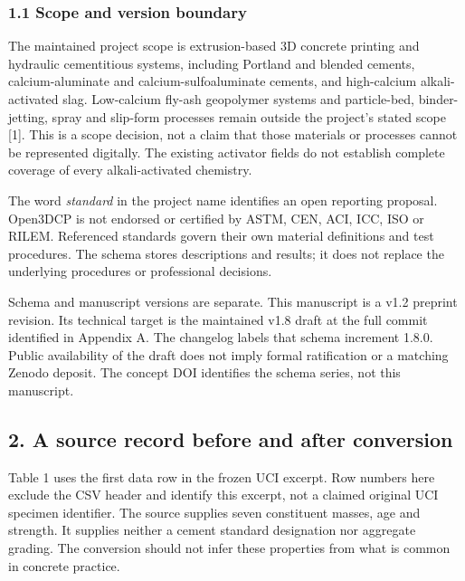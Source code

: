 \documentclass[
  american,
  11pt,
  letterpaper,
]{article}
\begin{document}
\subsubsection{1.1 Scope and version
boundary}\label{scope-and-version-boundary}

The maintained project scope is extrusion-based 3D concrete printing and
hydraulic cementitious systems, including Portland and blended cements,
calcium-aluminate and calcium-sulfoaluminate cements, and high-calcium
alkali-activated slag. Low-calcium fly-ash geopolymer systems and
particle-bed, binder-jetting, spray and slip-form processes remain
outside the project's stated scope {[}1{]}. This is a scope decision,
not a claim that those materials or processes cannot be represented
digitally. The existing activator fields do not establish complete
coverage of every alkali-activated chemistry.

The word \emph{standard} in the project name identifies an open
reporting proposal. Open3DCP is not endorsed or certified by ASTM, CEN,
ACI, ICC, ISO or RILEM. Referenced standards govern their own material
definitions and test procedures. The schema stores descriptions and
results; it does not replace the underlying procedures or professional
decisions.

Schema and manuscript versions are separate. This manuscript is a v1.2
preprint revision. Its technical target is the maintained v1.8 draft at
the full commit identified in Appendix A. The changelog labels that
schema increment 1.8.0. Public availability of the draft does not imply
formal ratification or a matching Zenodo deposit. The concept DOI
identifies the schema series, not this manuscript.

\subsection{2. A source record before and after
conversion}\label{a-source-record-before-and-after-conversion}

Table 1 uses the first data row in the frozen UCI excerpt. Row numbers
here exclude the CSV header and identify this excerpt, not a claimed
original UCI specimen identifier. The source supplies seven constituent
masses, age and strength. It supplies neither a cement standard
designation nor aggregate grading. The conversion should not infer these
properties from what is common in concrete practice.
\end{document}

